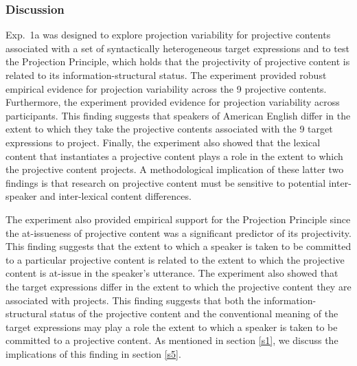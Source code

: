\documentclass[11pt,fleqn]{article}
\newcommand{\6}{\mbox{$[\hspace*{-.6mm}[$}}
\newcommand{\9}{\mbox{$]\hspace*{-.6mm}]$}}
\newcommand{\jd}[1]{\textbf{\color{Green}[jd: #1]}}
\begin{document}
%
%
%
%
%
%


\subsubsection{Discussion}\label{s-discussion1a}

Exp.~1a was designed to explore projection variability for projective contents associated with a set of syntactically heterogeneous target expressions and to test the Projection Principle, which holds that the projectivity of projective content is related to its information-structural status. The experiment provided robust empirical evidence for projection variability across the 9 projective contents. Furthermore, the experiment provided evidence for projection variability across participants. This finding suggests that speakers of American English differ in the extent to which they take the projective contents associated with the 9 target expressions to project. Finally, the experiment also showed that the lexical content that instantiates a projective content plays a role in the extent to which the projective content projects. A methodological implication of these latter two findings is that research on projective content must be sensitive to potential inter-speaker and inter-lexical content differences.

The experiment also provided empirical support for the Projection Principle since the at-issueness of projective content was a significant predictor of its projectivity. This finding suggests that the extent to which a speaker is taken to be committed to a particular projective content is related to the extent to which the projective content is at-issue in the speaker's utterance. The experiment also showed that the target expressions differ in the extent to which the projective content they are associated with projects. This finding suggests that both the information-structural status of the projective content and the conventional meaning of the target expressions may play a role the extent to which a speaker is taken to be committed to a projective content. As mentioned in section \ref{s1}, we discuss the implications of this finding in section \ref{s5}.
\end{document}

